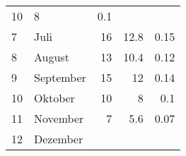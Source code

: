 \begin{longtable}{lXrrr}
       \num{10} &
       \num[round-mode=places,round-precision=2]{8} &
         \num[round-mode=places,round-precision=2]{0,1} \\

     7 &
     \multicolumn{1}{X}{ Juli   } &


       \num{16} &
       \num[round-mode=places,round-precision=2]{12,8} &
         \num[round-mode=places,round-precision=2]{0,15} \\

     8 &
     \multicolumn{1}{X}{ August   } &


       \num{13} &
       \num[round-mode=places,round-precision=2]{10,4} &
         \num[round-mode=places,round-precision=2]{0,12} \\

     9 &
     \multicolumn{1}{X}{ September   } &


       \num{15} &
       \num[round-mode=places,round-precision=2]{12} &
         \num[round-mode=places,round-precision=2]{0,14} \\

     10 &
     \multicolumn{1}{X}{ Oktober   } &


       \num{10} &
       \num[round-mode=places,round-precision=2]{8} &
         \num[round-mode=places,round-precision=2]{0,1} \\

     11 &
     \multicolumn{1}{X}{ November   } &


       \num{7} &
       \num[round-mode=places,round-precision=2]{5,6} &
         \num[round-mode=places,round-precision=2]{0,07} \\

     12 &
     \multicolumn{1}{X}{ Dezember   } &



\end{longtable}
